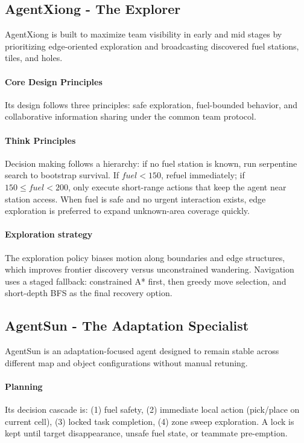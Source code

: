 \documentclass{article}
\begin{document}
\subsection{AgentXiong - The Explorer}

AgentXiong is built to maximize team visibility in early and mid stages by prioritizing edge-oriented exploration and broadcasting discovered fuel stations, tiles, and holes.

\paragraph{Core Design Principles}
Its design follows three principles: safe exploration, fuel-bounded behavior, and collaborative information sharing under the common team protocol.

\paragraph{Think Principles}
Decision making follows a hierarchy:
if no fuel station is known, run serpentine search to bootstrap survival.
If \(fuel<150\), refuel immediately; if \(150 \le fuel < 200\), only execute short-range actions that keep the agent near station access.
When fuel is safe and no urgent interaction exists, edge exploration is preferred to expand unknown-area coverage quickly.

\paragraph{Exploration strategy}
The exploration policy biases motion along boundaries and edge structures, which improves frontier discovery versus unconstrained wandering.
Navigation uses a staged fallback: constrained A* first, then greedy move selection, and short-depth BFS as the final recovery option.


\subsection{AgentSun - The Adaptation Specialist}
AgentSun is an adaptation-focused agent designed to remain stable across different map and object configurations without manual retuning.

\paragraph{Planning}
Its decision cascade is: (1) fuel safety, (2) immediate local action (pick/place on current cell), (3) locked task completion, (4) zone sweep exploration.
A lock is kept until target disappearance, unsafe fuel state, or teammate pre-emption.
\end{document}
